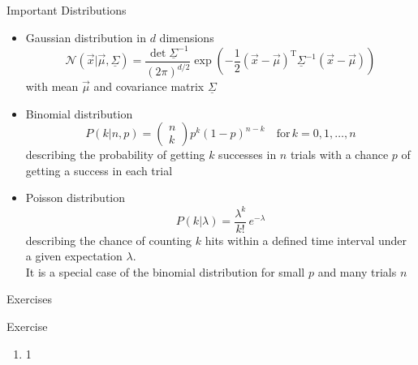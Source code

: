   \begin{frame}{Important Distributions}
    \begin{itemize}
      \item Gaussian distribution in $d$ dimensions
        \begin{equation*}
          \mathcal{N}(\vec{x}|\vec{\mu},\underline{\Sigma})
          = \frac{\det{\underline{\Sigma}^{-1}}}{(2\pi)^{d/2}}
            \exp\left(
              -\frac{1}{2} (\vec{x}-\vec{\mu})^\mathrm{T}
              \underline{\Sigma}^{-1} (\vec{x}-\vec{\mu})
            \right)
        \end{equation*}
        with mean $\vec{\mu}$ and covariance matrix $\underline{\Sigma}$
      \item Binomial distribution
        \begin{equation*}
          P(k|n,p) = \begin{pmatrix} n \\ k \end{pmatrix} p^k (1-p)^{n-k}
          \quad\mathrm{for}\, k = 0, 1, \dots, n
        \end{equation*}
        describing the probability of getting $k$ successes in $n$ trials with a chance $p$ of getting a success in each trial
      \item Poisson distribution
      \begin{equation*}
        P(k|\lambda) = \frac{\lambda^k}{k!}\,e^{-\lambda}
      \end{equation*}
      describing the chance of counting $k$ hits within a defined time interval under a given expectation $\lambda$.\\
      It is a special case of the binomial distribution for small $p$ and many trials $n$
    \end{itemize}
  \end{frame}

  \begin{frame}{Exercises}
    \begin{exampleblock}{Exercise}
      \begin{enumerate}
        \item 1
      \end{enumerate}
    \end{exampleblock}
  \end{frame}

